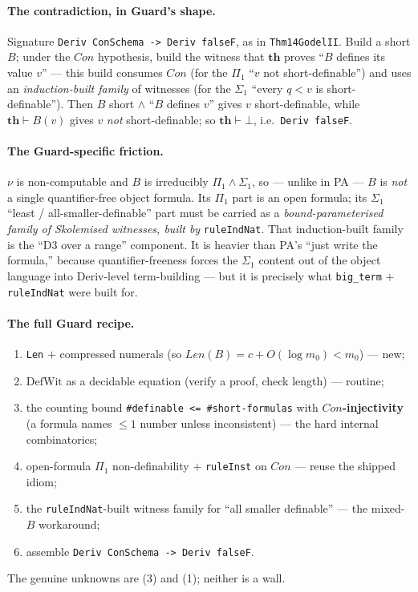 \documentclass[11pt]{article}
\theoremstyle{plain}
\theoremstyle{definition}
\theoremstyle{remark}
\newcommand{\Con}{\mathit{Con}}
\newcommand{\Len}{\mathit{Len}}
\newcommand{\thmT}{\mathbf{th}}
\begin{document}
\paragraph{The contradiction, in Guard's shape.}  Signature
\texttt{Deriv ConSchema -> Deriv falseF}, as in \texttt{Thm14GodelII}.
Build a short $B$; under the $\Con$ hypothesis, build the witness that
$\thmT$ proves ``$B$ defines its value $v$'' --- this build consumes
$\Con$ (for the $\Pi_1$ ``$v$ not short-definable'') and uses an
\emph{induction-built family} of witnesses (for the $\Sigma_1$ ``every
$q<v$ is short-definable'').  Then $B$ short $\wedge$ ``$B$ defines $v$''
gives $v$ short-definable, while $\thmT\vdash B(v)$ gives $v$ \emph{not}
short-definable; so $\thmT\vdash\bot$, i.e.\ \texttt{Deriv falseF}.

\paragraph{The Guard-specific friction.}  $\nu$ is non-computable and $B$
is irreducibly $\Pi_1\wedge\Sigma_1$, so --- unlike in PA --- $B$ is
\emph{not} a single quantifier-free object formula.  Its $\Pi_1$ part is
an open formula; its $\Sigma_1$ ``least / all-smaller-definable'' part
must be carried as a \emph{bound-parameterised family of Skolemised
witnesses, built by} \texttt{ruleIndNat}.  That induction-built family is
the ``D3 over a range'' component.  It is heavier than PA's ``just write
the formula,'' because quantifier-freeness forces the $\Sigma_1$ content
out of the object language into Deriv-level term-building --- but it is
precisely what \texttt{big\_term} $+$ \texttt{ruleIndNat} were built for.

\paragraph{The full Guard recipe.}
\begin{enumerate}
\item \texttt{Len} $+$ compressed numerals (so
  $\Len(B)=c+O(\log m_0)<m_0$) --- new;
\item $\mathrm{DefWit}$ as a decidable equation (verify a proof, check
  length) --- routine;
\item the counting bound \texttt{\#definable <= \#short-formulas} with
  \textbf{$\Con$-injectivity} (a formula names $\le 1$ number unless
  inconsistent) --- the hard internal combinatorics;
\item open-formula $\Pi_1$ non-definability $+$ \texttt{ruleInst} on
  $\Con$ --- reuse the shipped idiom;
\item the \texttt{ruleIndNat}-built witness family for ``all smaller
  definable'' --- the mixed-$B$ workaround;
\item assemble \texttt{Deriv ConSchema -> Deriv falseF}.
\end{enumerate}
The genuine unknowns are (3) and (1); neither is a wall.
\end{document}
